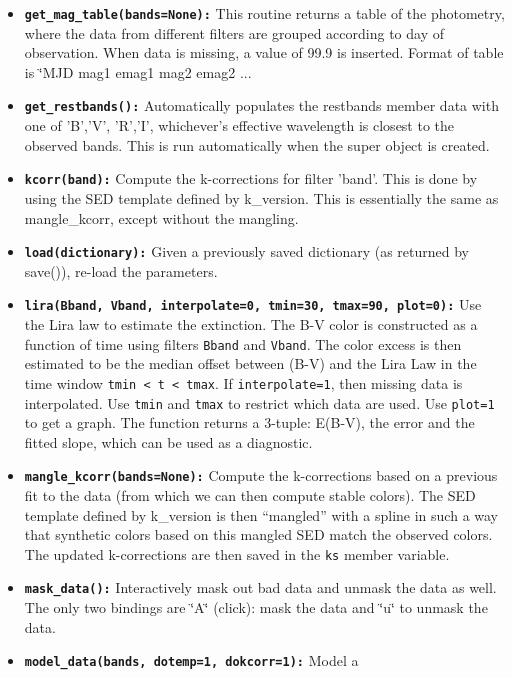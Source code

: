 \documentclass[12pt]{article}
\begin{document}
\begin{itemize}
(based on template) needed; 3 - data interpolated or extrapolated
beyond template's definition, so not safe to use!
\item \texttt{\textbf{get\_mag\_table(bands=None):}} This routine returns
a table of the photometry, where the data from different filters are
grouped according to day of observation. When data is missing, a value
of 99.9 is inserted. Format of table is \char`\"{}MJD mag1 emag1 mag2
emag2 ... 
\item \texttt{\textbf{get\_restbands():}} Automatically populates the restbands
member data with one of 'B','V', 'R','I', whichever's effective wavelength
is closest to the observed bands. This is run automatically when the
super object is created. 
\item \texttt{\textbf{kcorr(band):}} Compute the k-corrections for filter
'band'. This is done by using the SED template defined by k\_version.
This is essentially the same as mangle\_kcorr, except without the
mangling.
\item \texttt{\textbf{load(dictionary):}} Given a previously saved dictionary
(as returned by save()), re-load the parameters.
\item \texttt{\textbf{lira(Bband, Vband, interpolate=0, tmin=30, tmax=90,
plot=0):}} Use the Lira law to estimate the extinction. The B-V color
is constructed as a function of time using filters \texttt{Bband}
and \texttt{Vband}. The color excess is then estimated to be the median
offset between (B-V) and the Lira Law in the time window \texttt{tmin
< t < tmax}. If \texttt{interpolate=1}, then missing data is interpolated.
Use \texttt{tmin} and \texttt{tmax} to restrict which data are used.
Use \texttt{plot=1} to get a graph. The function returns a 3-tuple:
E(B-V), the error and the fitted slope, which can be used as a diagnostic.
\item \texttt{\textbf{mangle\_kcorr(bands=None):}} Compute the k-corrections
based on a previous fit to the data (from which we can then compute
stable colors). The SED template defined by k\_version is then {}``mangled''
with a spline in such a way that synthetic colors based on this mangled
SED match the observed colors. The updated k-corrections are then
saved in the \texttt{ks} member variable.
\item \texttt{\textbf{mask\_data():}} Interactively mask out bad data and
unmask the data as well. The only two bindings are \char`\"{}A\char`\"{}
(click): mask the data and \char`\"{}u\char`\"{} to unmask the data. 
\item \texttt{\textbf{model\_data(bands, dotemp=1, dokcorr=1):}} Model a

\end{itemize}
\end{document}
